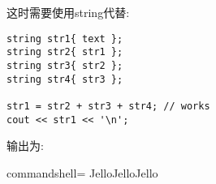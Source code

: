 \begin{itemize}
这时需要使用string代替:

\begin{lstlisting}[style=styleCXX]
string str1{ text };
string str2{ str1 };
string str3{ str2 };
string str4{ str3 };

str1 = str2 + str3 + str4; // works
cout << str1 << '\n';
\end{lstlisting}

输出为:

\begin{tcblisting}{commandshell={}}
JelloJelloJello
\end{tcblisting}
\end{itemize}

